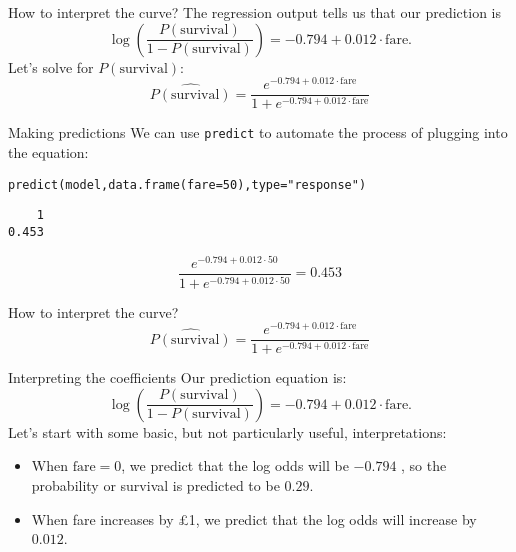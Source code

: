 \documentclass{beamer}\usepackage[]{graphicx}\usepackage[]{color}
\makeatletter
\newcommand{\hlnum}[1]{\textcolor[rgb]{0.824,0.412,0.118}{#1}}%
\newcommand{\hlstr}[1]{\textcolor[rgb]{1,0.894,0.71}{#1}}%
\newcommand{\hlstd}[1]{\textcolor[rgb]{1,0.894,0.769}{#1}}%
\newcommand{\hlkwc}[1]{\textcolor[rgb]{0.78,0.941,0.545}{#1}}%
\newcommand{\hlkwd}[1]{\textcolor[rgb]{1,0.78,0.769}{#1}}%
\newenvironment{kframe}{%
 \def\at@end@of@kframe{}%
 \ifinner\ifhmode%
  \def\at@end@of@kframe{\end{minipage}}%
  \begin{minipage}{\columnwidth}%
 \fi\fi%
 \def\FrameCommand##1{\hskip\@totalleftmargin \hskip-\fboxsep
 \colorbox{shadecolor}{##1}\hskip-\fboxsep
     \hskip-\linewidth \hskip-\@totalleftmargin \hskip\columnwidth}%
 \MakeFramed {\advance\hsize-\width
   \@totalleftmargin\z@ \linewidth\hsize
   \@setminipage}}%
 {\par\unskip\endMakeFramed%
 \at@end@of@kframe}
\newenvironment{knitrout}{}{} %
\makeatother
\begin{document}
\begin{darkframes}
\begin{frame}{How to interpret the curve?}
      The regression output tells us that our prediction is
      \[
        \log\left(\frac{P(\text{survival})}{1-P(\text{survival})}\right) = -0.794 + 0.012\cdot\text{fare}.
      \]
      \pause
      Let's solve for $P(\text{survival})$:
      \[
        \widehat{P(\text{survival})} = \frac{e^{-0.794 + 0.012\cdot\text{fare}}}{1 + e^{-0.794 + 0.012\cdot\text{fare}}}
      \]
      \lc
    \end{frame}

    \begin{frame}[fragile]{Making predictions}
      We can use \texttt{predict} to automate the process of plugging into the equation:
\begin{knitrout}
\begin{kframe}
\begin{alltt}
\hlkwd{predict}\hlstd{(model,} \hlkwd{data.frame}\hlstd{(}\hlkwc{fare}\hlstd{=}\hlnum{50}\hlstd{),} \hlkwc{type}\hlstd{=}\hlstr{"response"}\hlstd{)}
\end{alltt}
\begin{verbatim}
    1 
0.453 
\end{verbatim}
\end{kframe}
\end{knitrout}
      
      \[
        \frac{e^{-0.794 + 0.012\cdot 50}}{1 + e^{-0.794 + 0.012\cdot 50}} = 0.453
      \]
    \end{frame}

    \begin{frame}[fragile]{How to interpret the curve?}
      \[
        \widehat{P(\text{survival})} = \frac{e^{-0.794 + 0.012\cdot\text{fare}}}{1 + e^{-0.794 + 0.012\cdot\text{fare}}}
      \]
\begin{knitrout}


\end{knitrout}
    \end{frame}

    \begin{frame}{Interpreting the coefficients}
      Our prediction equation is:
      \[
        \log\left(\frac{P(\text{survival})}{1-P(\text{survival})}\right) = -0.794 + 0.012\cdot\text{fare}.
      \]
      Let's start with some basic, but not particularly useful, interpretations:
      \begin{itemize}[<+->]
        \item When $\text{fare}=0$, we predict that the log odds will be $-0.794$ \pause, so the probability or survival is predicted to be $0.29$.
        \item When fare increases by \pounds 1, we predict that the log odds will increase by $0.012$.
      \end{itemize}
    \end{frame}


\end{darkframes}
\end{document}
